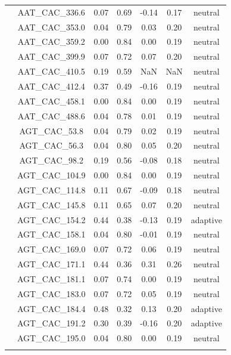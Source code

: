 \documentclass[11pt,]{article}
\begin{document}
\begin{longtable}[c]{@{}lcccccc@{}}
\\\addlinespace
& AAT\_CAC\_336.6 & 0.07 & 0.69 & -0.14 & 0.17 & neutral
\\\addlinespace
& AAT\_CAC\_353.0 & 0.04 & 0.79 & 0.03 & 0.20 & neutral
\\\addlinespace
& AAT\_CAC\_359.2 & 0.00 & 0.84 & 0.00 & 0.19 & neutral
\\\addlinespace
& AAT\_CAC\_399.9 & 0.07 & 0.72 & 0.07 & 0.20 & neutral
\\\addlinespace
& AAT\_CAC\_410.5 & 0.19 & 0.59 & NaN & NaN & neutral
\\\addlinespace
& AAT\_CAC\_412.4 & 0.37 & 0.49 & -0.16 & 0.19 & neutral
\\\addlinespace
& AAT\_CAC\_458.1 & 0.00 & 0.84 & 0.00 & 0.19 & neutral
\\\addlinespace
& AAT\_CAC\_488.6 & 0.04 & 0.78 & 0.01 & 0.19 & neutral
\\\addlinespace
& AGT\_CAC\_53.8 & 0.04 & 0.79 & 0.02 & 0.19 & neutral
\\\addlinespace
& AGT\_CAC\_56.3 & 0.04 & 0.80 & 0.05 & 0.20 & neutral
\\\addlinespace
& AGT\_CAC\_98.2 & 0.19 & 0.56 & -0.08 & 0.18 & neutral
\\\addlinespace
& AGT\_CAC\_104.9 & 0.00 & 0.84 & 0.00 & 0.19 & neutral
\\\addlinespace
& AGT\_CAC\_114.8 & 0.11 & 0.67 & -0.09 & 0.18 & neutral
\\\addlinespace
& AGT\_CAC\_145.8 & 0.11 & 0.65 & 0.07 & 0.20 & neutral
\\\addlinespace
& AGT\_CAC\_154.2 & 0.44 & 0.38 & -0.13 & 0.19 & adaptive
\\\addlinespace
& AGT\_CAC\_158.1 & 0.04 & 0.80 & -0.01 & 0.19 & neutral
\\\addlinespace
& AGT\_CAC\_169.0 & 0.07 & 0.72 & 0.06 & 0.19 & neutral
\\\addlinespace
& AGT\_CAC\_171.1 & 0.44 & 0.36 & 0.31 & 0.26 & neutral
\\\addlinespace
& AGT\_CAC\_181.1 & 0.07 & 0.74 & 0.00 & 0.19 & neutral
\\\addlinespace
& AGT\_CAC\_183.0 & 0.07 & 0.72 & 0.05 & 0.19 & neutral
\\\addlinespace
& AGT\_CAC\_184.4 & 0.48 & 0.32 & 0.13 & 0.20 & adaptive
\\\addlinespace
& AGT\_CAC\_191.2 & 0.30 & 0.39 & -0.16 & 0.20 & adaptive
\\\addlinespace
& AGT\_CAC\_195.0 & 0.04 & 0.80 & 0.00 & 0.19 & neutral
\\\addlinespace

\end{longtable}
\end{document}
